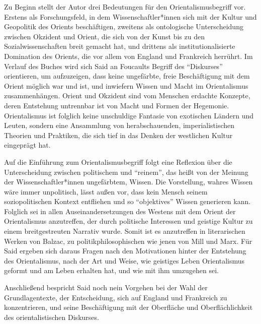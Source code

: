 \documentclass[a4paper, 12pt]{article}
\begin{document}
\begin{onehalfspace} 





\noindent Zu Beginn stellt der Autor drei Bedeutungen für den Orientalismusbegriff vor. Erstens als Forschungsfeld, in dem Wissenschaftler*innen sich mit der Kultur und Geopolitik des Orients beschäftigen, zweitens als ontologische Unterscheidung zwischen Okzident und Orient, die sich von der Kunst bis zu den Sozialwissenschaften breit gemacht hat, und drittens als institutionalisierte Domination des Orients, die vor allem von England und Frankreich herrührt. Im Verlauf des Buches wird sich Said an Foucaults Begriff des "`Diskurses"' orientieren, um aufzuzeigen, dass keine ungefärbte, freie Beschäftigung mit dem Orient möglich war und ist, und inwiefern Wissen und Macht im Orientalismus zusammenhängen. Orient und Okzident sind vom Menschen erdachte Konzepte, deren Entstehung untrennbar ist von Macht und Formen der Hegemonie. Orientalismus ist folglich keine unschuldige Fantasie von exotischen Ländern und Leuten, sondern eine Ansammlung von herabschauenden, imperialistischen Theorien und Praktiken, die sich tief in das Denken der westlichen Kultur eingeprägt hat. 

Auf die Einführung zum Orientalismusbegriff folgt eine Reflexion über die Unterscheidung zwischen politischem und "`reinem"', das heißt von der Meinung der Wissenschaftler*innen ungefärbtem, Wissen. Die Vorstellung, wahres Wissen wäre immer unpolitisch, lässt außen vor, dass kein Mensch seinem soziopolitischen Kontext entfliehen und so "`objektives"' Wissen generieren kann. Folglich sei in allen Auseinandersetzungen des Westens mit dem Orient der Orientalismus anzutreffen, der durch politische Interessen und geistige Kultur zu einem breitgestreuten Narrativ wurde. Somit ist es anzutreffen in literarischen Werken von Balzac, zu politikphilosophischen wie jenen von Mill und Marx. Für Said ergeben sich daraus Fragen nach den Motivationen hinter der Entstehung des Orientalismus, nach der Art und Weise, wie geistiges Leben Orientalismus geformt und am Leben erhalten hat, und wie mit ihm umzugehen sei. 

Anschließend bespricht Said noch nein Vorgehen bei der Wahl der Grundlagentexte, der Entscheidung, sich auf England und Frankreich zu konzentrieren, und seine Beschäftigung mit der Oberfläche und Oberflächlichkeit des orientalistischen Diskurses.


\end{onehalfspace}
\end{document}
